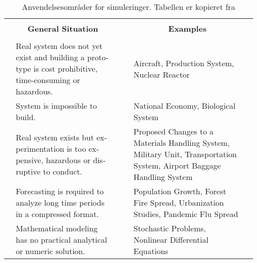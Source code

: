 \begin{table}[ht]
  \begin{otherlanguage}{english} 	
  \begin{tabularx}{\textwidth}{|p{15pt}Xp{15pt}|p{15pt}Xp{15pt}|}
  \hline  
  &&&&&\\
  \multicolumn{3}{|c|}{\textbf{General Situation}}&\multicolumn{3}{c|}{\textbf{Examples}} \\
  &&&&&\\  
  \hline
  & \vspace{5pt}Real system does not yet exist and building a prototype is cost prohibitive, time-consuming or hazardous. \vspace{5pt}& & & \vspace{5pt}Aircraft, Production System, Nuclear Reactor \vspace{5pt}& \\
  \hline  
  & \vspace{5pt}System is impossible to build.\vspace{5pt} & & & \vspace{3pt}National Economy, Biological System\vspace{5pt} &\\
  \hline
  & \vspace{5pt}Real system exists but experimentation is too expensive, hazardous or disruptive to conduct.\vspace{5pt} & & & \vspace{5pt}Proposed Changes to a Materials Handling System, Military Unit, Transportation System, Airport Baggage Handling System\vspace{5pt} & \\
  \hline
  & \vspace{5pt}Forecasting is required to analyze long time periods in a compressed format.\vspace{5pt} & & & \vspace{5pt}Population Growth, Forest Fire Spread, Urbanization Studies, Pandemic Flu Spread \vspace{5pt}&\\
  \hline
  & \vspace{5pt}Mathematical modeling has no practical analytical or numeric solution.\vspace{5pt} & & & \vspace{5pt}Stochastic Problems, Nonlinear Differential Equations\vspace{5pt} & \\
  \hline	
  \end{tabularx}
  \end{otherlanguage}	
  \caption{Anvendelsesområder for simuleringer. Tabellen er kopieret fra \cite[10]{Mchaney2009}}
	\label{tab:simulation_examples}
\end{table}


